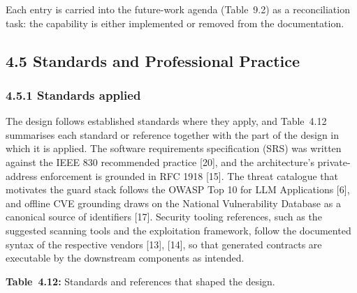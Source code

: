 \documentclass[
]{article}
\begin{document}
Each entry is carried into the future-work agenda (Table~9.2) as a
reconciliation task: the capability is either implemented or removed
from the documentation.

\hypertarget{standards-and-professional-practice}{%
\subsection{4.5 Standards and Professional
Practice}\label{standards-and-professional-practice}}

\hypertarget{standards-applied}{%
\subsubsection{4.5.1 Standards applied}\label{standards-applied}}

The design follows established standards where they apply, and
Table~4.12 summarises each standard or reference together with the part
of the design in which it is applied. The software requirements
specification (SRS) was written against the IEEE 830 recommended
practice {[}20{]}, and the architecture's private-address enforcement is
grounded in RFC 1918 {[}15{]}. The threat catalogue that motivates the
guard stack follows the OWASP Top 10 for LLM Applications {[}6{]}, and
offline CVE grounding draws on the National Vulnerability Database as a
canonical source of identifiers {[}17{]}. Security tooling references,
such as the suggested scanning tools and the exploitation framework,
follow the documented syntax of the respective vendors {[}13{]},
{[}14{]}, so that generated contracts are executable by the downstream
components as intended.

\protect\hypertarget{_Toc900097}{}{}\textbf{Table~4.12:} Standards and
references that shaped the design.
\end{document}
